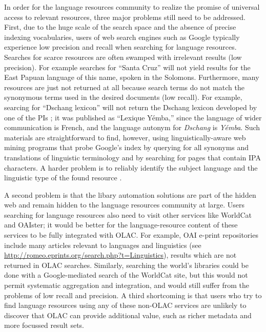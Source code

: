 
In order for the language resources community to realize the promise of universal access to relevant resources, three major
problems still need to be addressed.
First, due to the huge scale of the search space and the absence
of precise indexing vocabularies,
users of web search engines such as Google typically experience
low precision and recall when searching for language resources.
Searches for scarce resources are often swamped with irrelevant
results (low precision).  For example searches for ``Santa Cruz'' will
not yield results for the East Papuan language of this name, spoken in
the Solomons.
Furthermore, many resources are just not returned at all because
search terms do not match the synonymous terms used in the desired
documents (low recall).  For example, searcing for ``Dschang lexicon''
will not return the Dschang lexicon developed by one of the PIs
\citep{BirdTadadjeu97}; it was published as ``Lexique Y\'emba,'' since
the language of wider communication is French, and the language
autonym for \textit{Dschang} is \textit{Y\'emba}.
Such materials are straightforward to find, however, using
linguistically-aware web mining programs that probe
Google's index by querying for all synonyms and translations of
linguistic terminology and by searching for pages that contain IPA characters.
A harder problem is to reliably identify the subject language and the
linguistic type of the found resource \citep{HughesBaldwin06lrec}.

A second problem is that the libary automation solutions are part of
the hidden web and remain hidden to the language resources community
at large.
Users searching for language
resources also need to visit other services like WorldCat and OAIster;
it would be better for the language-resource content
of these services to be fully integrated with OLAC.
For example, OAI e-print repositories include many articles
relevant to languages and linguistics (see
\url{http://romeo.eprints.org/search.php?t=Linguistics}),
results which are not returned in OLAC searches.
Similarly, searching the world's libraries could be done with a
Google-mediated search of the WorldCat site, but this would not
permit systematic aggregation and integration, and would still suffer
from the problems of low recall and precision.
A third shortcoming is that users who try to find language resources
using any of these non-OLAC services are unlikely to discover that
OLAC can provide additional value, such as richer metadata and more
focussed result sets.

